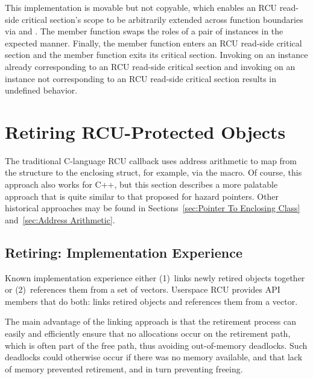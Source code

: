 \documentclass[letterpaper,10pt]{article}
\begin{document}
This implementation is movable but not copyable, which enables
an RCU read-side critical section's scope to be arbitrarily
extended across function boundaries via  and
.
The  member function swaps the roles
of a pair of  instances in the expected manner.
Finally, the  member function enters an
RCU read-side critical section and the 
member function exits its critical section.
Invoking  on an instance already corresponding
to an RCU read-side critical section and invoking
 on an instance not corresponding to
an RCU read-side critical section results in undefined behavior.

\section{Retiring RCU-Protected Objects}
\label{sec:Retiring RCU-Protected Objects}

The traditional C-language RCU callback uses address arithmetic
to map from the  structure to the enclosing struct,
for example, via the  macro.
Of course, this approach also works for C++, but this section describes
a more palatable approach that is quite similar to that proposed for
hazard pointers.
Other historical approaches may be found in
Sections~\ref{sec:Pointer To Enclosing Class}
and~\ref{sec:Address Arithmetic}.

\subsection{Retiring: Implementation Experience}
\label{sec:Retiring: Implementation Experience}

Known implementation experience either (1)~links newly retired
objects together or (2)~references them from a set of vectors.
Userspace RCU provides API members that do both:  
links retired objects and  references them from a
vector.

The main advantage of the linking approach is that the retirement
process can easily and efficiently ensure that no allocations occur on
the retirement path, which is often part of the free path, thus avoiding
out-of-memory deadlocks.
Such deadlocks could otherwise occur if there was no memory available,
and that lack of memory prevented retirement, and in turn preventing freeing.
\end{document}
